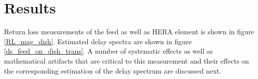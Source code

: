 \documentclass[twocolumn]{emulateapj}
\newcommand{\vis}{{V}}
\begin{document}
     \section{\textbf{Results}}
    Return loss measurements of the feed as well as HERA element is shown in figure \ref{RL_mag_dish}. Estimated        
    delay spectra are shown in figure \ref{ds_feed_on_dish_trans}. A number of systematic effects as well as
    mathematical artifacts that are critical to this measurement and their effects
    on the corresponding estimation of the delay spectrum are discussed next. 
    
    
    
\end{document}
